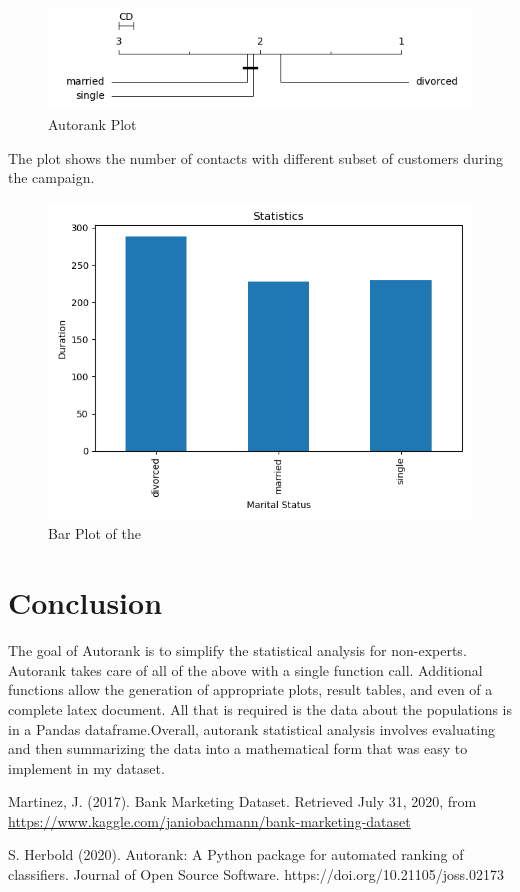 \documentclass[12pt]{article}
\begin{document}
\begin{figure}[!htbp]
	\centering
	\includegraphics[width=15 cm]{stat_auto_rank.png}
	\caption{Autorank Plot}
\end{figure}

\newpage
The plot shows the number of contacts with different subset of customers during the campaign.
\begin{figure}[!htbp]
	\centering
	\includegraphics[width=15 cm]{mean.png}
	\caption{Bar Plot of the }
\end{figure}


\section{Conclusion}
The goal of Autorank is to simplify the statistical analysis for non-experts. Autorank takes care of all of the above with a single function call. Additional functions allow the generation of appropriate plots, result tables, and even of a complete latex document. All that is required is the data about the populations is in a Pandas dataframe.Overall, autorank statistical analysis involves evaluating and then summarizing the data into a mathematical form that was easy to implement in my dataset. 
\newpage

\begin{thebibliography}{999}

	Martinez, J. (2017). Bank Marketing Dataset. Retrieved July 31, 2020, from {\url{https://www.kaggle.com/janiobachmann/bank-marketing-dataset}}

   
	S. Herbold (2020). Autorank: A Python package for automated ranking of classifiers. Journal of Open Source Software. https://doi.org/10.21105/joss.02173


\end{thebibliography}
\end{document}

